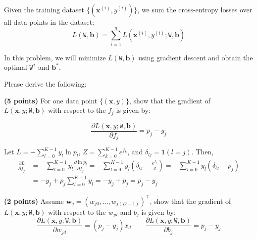 \documentclass{article}
\newcommand{\x}{\mathbf{x}}
\newcommand{\w}{\mathbf{w}}
\newcommand{\W}{\texttt{W}}
\renewcommand{\b}{\mathbf{b}}
\begin{document}
\begin{probset}
\begin{prob}
    Given the training dataset $\{(\x^{(i)}, y^{(i)})\}$, we sum the cross-entropy losses over all data points in the dataset:
    \[ L(\W, \b) = \sum_{i=1}^n L(\x^{(i)}, y^{(i)}; \W, \b) \]

    In this problem, we will minimize $L(\W, \b)$ using gradient descent and obtain the optimal $\W^*$ and $\b^*$.

    Please derive the following:

    \newpage

    \begin{subprobset}
        \begin{subprob}
            \textbf{(5 points)} For one data point $\{(\x, y)\}$, show that the gradient of $L(\x, y; \W, \b)$ with respect to the $f_j$ is given by:

            \[ \frac{\partial L(\x, y; \W, \b)}{\partial f_j} = p_j - y_j \]

            \begin{soln}
                Let $L = -\sum_{l=0}^{K-1} y_l \ln p_l$, $Z = \sum_{k=0}^{K-1} e^{f_k}$, and $
                \delta_{lj} = \textbf{1}(l = j)$. Then,
                \begin{align*}
                    \frac{\partial L}{\partial f_j}
                    &= -\sum_{l=0}^{K-1} y_l \frac{\partial \ln p_l}{\partial f_j}
                    = -\sum_{l=0}^{K-1} y_l \left( \delta_{lj} - \frac{e^{f_j}}{Z} \right)
                    = -\sum_{l=0}^{K-1} y_l (\delta_{lj} - p_j) \\
                    &= -y_j + p_j \sum_{l=0}^{K-1} y_l
                    = -y_j + p_j
                    = p_j - y_j
                \end{align*}
            \end{soln}
        \end{subprob}

        \begin{subprob}
            \textbf{(2 points)} Assume $\w_j = (w_{j0}, ..., w_{j(D-1)})^\top$, show that the gradient of $L(\x, y; \W, \b)$ with respect to the $w_{jd}$ and $b_j$ is given by:
            \[ \frac{\partial L(\x, y; \W, \b)}{\partial w_{jd}} = (p_j - y_j) x_d \qquad \frac{\partial L(\x, y; \W, \b)}{\partial b_j} = p_j - y_j \]


\end{subprob}
\end{subprobset}
\end{prob}
\end{probset}
\end{document}
